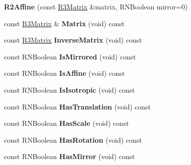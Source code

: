 \begin{DoxyCompactItemize}
\item 
{\bfseries R2\+Affine} (const \hyperlink{class_r3_matrix}{R3\+Matrix} \&matrix, R\+N\+Boolean mirror=0)\hypertarget{class_r2_affine_afbf6c50a11cb1fae9e9ee5cc3652d8dc}{}\label{class_r2_affine_afbf6c50a11cb1fae9e9ee5cc3652d8dc}

\item 
const \hyperlink{class_r3_matrix}{R3\+Matrix} \& {\bfseries Matrix} (void) const \hypertarget{class_r2_affine_ae8934f2dbaff8df4f9cfd64d5e12e2b9}{}\label{class_r2_affine_ae8934f2dbaff8df4f9cfd64d5e12e2b9}

\item 
const \hyperlink{class_r3_matrix}{R3\+Matrix} {\bfseries Inverse\+Matrix} (void) const \hypertarget{class_r2_affine_ab81f2dd63c4b1cf320dbfa795156d4ec}{}\label{class_r2_affine_ab81f2dd63c4b1cf320dbfa795156d4ec}

\item 
const R\+N\+Boolean {\bfseries Is\+Mirrored} (void) const \hypertarget{class_r2_affine_a9299c3d3aee30abca64615b2f00b20e8}{}\label{class_r2_affine_a9299c3d3aee30abca64615b2f00b20e8}

\item 
const R\+N\+Boolean {\bfseries Is\+Affine} (void) const \hypertarget{class_r2_affine_a4a3cd8795d3476823b91fe831bfcde9c}{}\label{class_r2_affine_a4a3cd8795d3476823b91fe831bfcde9c}

\item 
const R\+N\+Boolean {\bfseries Is\+Isotropic} (void) const \hypertarget{class_r2_affine_a1af45ac81d41147665302bca14709ef7}{}\label{class_r2_affine_a1af45ac81d41147665302bca14709ef7}

\item 
const R\+N\+Boolean {\bfseries Has\+Translation} (void) const \hypertarget{class_r2_affine_a0e7fd172a538348efff4723d871b940d}{}\label{class_r2_affine_a0e7fd172a538348efff4723d871b940d}

\item 
const R\+N\+Boolean {\bfseries Has\+Scale} (void) const \hypertarget{class_r2_affine_ae06342108d6e677f85f7383f5b9dbfe1}{}\label{class_r2_affine_ae06342108d6e677f85f7383f5b9dbfe1}

\item 
const R\+N\+Boolean {\bfseries Has\+Rotation} (void) const \hypertarget{class_r2_affine_aa1976a92645fd787afac2729ac07f80e}{}\label{class_r2_affine_aa1976a92645fd787afac2729ac07f80e}

\item 
const R\+N\+Boolean {\bfseries Has\+Mirror} (void) const \hypertarget{class_r2_affine_ae3fc6b83f474115c6fb194e620d48cf1}{}\label{class_r2_affine_ae3fc6b83f474115c6fb194e620d48cf1}


\end{DoxyCompactItemize}
